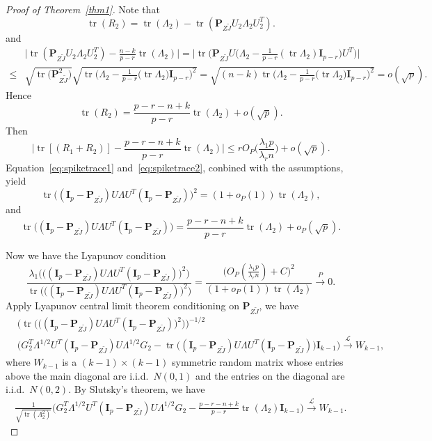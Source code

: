 \documentclass[12pt]{article} %
\DeclareMathOperator{\mytr}{tr}
\newcommand{\bP}{\mathbf{P}}
\newcommand{\bI}{\mathbf{I}}
\theoremstyle{definition}
\begin{document}
\begin{proof}[\textrm{Proof of Theorem~\ref{thm1}}]
Note that
    $$
    \mytr(R_2)
    =
    \mytr(\Lambda_2)-\mytr(\bP_{Z\tilde{J}}U_2\Lambda_2 U_2^T).
    $$ 
and
    $$
    \begin{aligned}
        &
        \big|
    \mytr(\bP_{Z\tilde{J}}U_2\Lambda_2 U_2^T)
    -\frac{n-k}{p-r}\mytr(\Lambda_2)
    \big|
    =
    \big|
        \mytr\Big(\bP_{Z\tilde{J}} U \big(\Lambda_2-\frac{1}{p-r} (\mytr \Lambda_2) \bI_{p-r} \big) U^T\Big)
    \big|
        \\
        \leq &
        \sqrt{\mytr \big(\bP_{Z\tilde{J}}^2\big)}
        \sqrt{\mytr \Big(\Lambda_2-\frac{1}{p-r}\big(\mytr \Lambda_2\big) \bI_{p-r}\Big)^2}
        =\sqrt{(n-k)\mytr \Big(\Lambda_2-\frac{1}{p-r}\big(\mytr \Lambda_2\big) \bI_{p-r}\Big)^2}
        =o(\sqrt{p}).
    \end{aligned}
    $$
    Hence 
    $$
    \mytr(R_2)
    =
    \frac{p-r-n+k}{p-r}\mytr(\Lambda_2)+o(\sqrt{p}).
    $$
    Then
\begin{equation}\label{eq:spiketrace2}
\big| \mytr [(R_1+R_2)]-\frac{p-r-n+k}{p-r}\mytr(\Lambda_2)\big|\leq 
rO_P\big(\frac{\lambda_1 p}{\lambda_r n}\big)+o(\sqrt{p}).
\end{equation}
Equation~\eqref{eq:spiketrace1} and~\eqref{eq:spiketrace2}, conbined with the assumptions, yield
$$
    \mytr\big((\bI_p-\bP_{Z\tilde{J}})U\Lambda U^T (\bI_p-\bP_{Z\tilde{J}})\big)^2 
 =(1+o_P(1))\mytr(\Lambda_2),
$$
and
$$
\mytr\big((\bI_p-\bP_{Z\tilde{J}})U\Lambda U^T (\bI_p-\bP_{Z\tilde{J}})\big)
= \frac{p-r-n+k}{p-r}\mytr(\Lambda_2)+o_P(\sqrt{p}).
$$

Now we have the Lyapunov condition
$$
\frac{\lambda_1\Big(\big((\bI_p-\bP_{Z\tilde{J}})U\Lambda U^T (\bI_p-\bP_{Z\tilde{J}})\big)^2\Big)}{\mytr \Big( \big((\bI_p-\bP_{Z\tilde{J}})U\Lambda U^T (\bI_p-\bP_{Z\tilde{J}})\big)^2\Big)}
=
\frac{
\big( O_P(\frac{\lambda_1 p}{\lambda_r n})+C\big)^2
}{
    (1+o_P(1))\mytr(\Lambda_2)
}
\xrightarrow{P} 0.
$$
Apply Lyapunov central limit theorem conditioning on $\bP_{Z\tilde{J}}$, we have
$$
\begin{aligned}
    &\Big(\mytr \Big( \big((\bI_p-\bP_{Z\tilde{J}})U\Lambda U^T (\bI_p-\bP_{Z\tilde{J}})\big)^2\Big) \Big)^{-1/2}\\
    &\big( G_2^T \Lambda^{1/2}U^T (\bI_p-\bP_{Z\tilde{J}})U\Lambda^{1/2}G_2
    -\mytr\big((\bI_p-\bP_{Z\tilde{J}})U\Lambda U^T (\bI_p-\bP_{Z\tilde{J}})\big)
     \bI_{k-1} \big)
\xrightarrow{\mathcal{L}} W_{k-1},
\end{aligned}
$$
where $W_{k-1}$ is a $(k-1)\times(k-1)$ symmetric random matrix whose entries above the main diagonal are i.i.d.\ $N(0,1)$ and the entries on the diagonal are i.i.d.\ $N(0,2)$.
By Slutsky's theorem, we have
$$
\begin{aligned}
    \frac{1}{\sqrt{\mytr(\Lambda_2^2)}}
    \big( G_2^T \Lambda^{1/2}U^T (\bI_p-\bP_{Z\tilde{J}})U\Lambda^{1/2}G_2
    -\tfrac{p-r-n+k}{p-r}\mytr(\Lambda_2)\bI_{k-1} \big)
\xrightarrow{\mathcal{L}} W_{k-1}.
\end{aligned}
$$




\end{proof}
\end{document}
